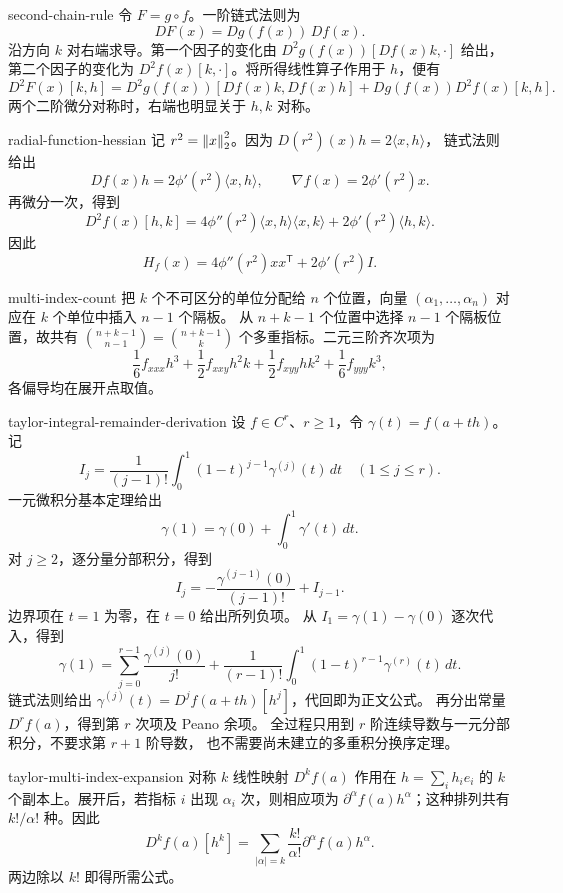 \begin{solution}{second-chain-rule}
令 $F=g\circ f$。一阶链式法则为
\[
 DF(x)=Dg(f(x))\,Df(x).
\]
沿方向 $k$ 对右端求导。第一个因子的变化由
$D^2g(f(x))[Df(x)k,\cdot]$ 给出，第二个因子的变化为
$D^2f(x)[k,\cdot]$。将所得线性算子作用于 $h$，便有
\[
 D^2F(x)[k,h]
 =D^2g(f(x))[Df(x)k,Df(x)h]
  +Dg(f(x))D^2f(x)[k,h].
\]
两个二阶微分对称时，右端也明显关于 $h,k$ 对称。
\end{solution}

\begin{solution}{radial-function-hessian}
记 $r^2=\left\lVert x\right\rVert_2^2$。因为 $D(r^2)(x)h=2\langle x,h\rangle$，
链式法则给出
\[
 Df(x)h=2\phi'(r^2)\langle x,h\rangle,
 \qquad
 \nabla f(x)=2\phi'(r^2)x.
\]
再微分一次，得到
\[
 D^2f(x)[h,k]
 =4\phi''(r^2)\langle x,h\rangle\langle x,k\rangle
  +2\phi'(r^2)\langle h,k\rangle.
\]
因此
\[
 H_f(x)=4\phi''(r^2)xx^{\mathsf T}+2\phi'(r^2)I.
\]
\end{solution}

\begin{solution}{multi-index-count}
把 $k$ 个不可区分的单位分配给 $n$ 个位置，向量
$(\alpha_1,\ldots,\alpha_n)$ 对应在 $k$ 个单位中插入 $n-1$ 个隔板。
从 $n+k-1$ 个位置中选择 $n-1$ 个隔板位置，故共有
\(
 \binom{n+k-1}{n-1}=\binom{n+k-1}{k}
\)
个多重指标。二元三阶齐次项为
\[
 \frac16f_{xxx}h^3+\frac12f_{xxy}h^2k
 +\frac12f_{xyy}hk^2+\frac16f_{yyy}k^3,
\]
各偏导均在展开点取值。
\end{solution}

\begin{solution}{taylor-integral-remainder-derivation}
设 \(f\in C^r\)、\(r\ge1\)，令 $\gamma(t)=f(a+th)$。
记
\[
 I_j=\frac1{(j-1)!}\int_0^1(1-t)^{j-1}\gamma^{(j)}(t)\,dt
 \quad(1\le j\le r).
\]
一元微积分基本定理给出
\[
 \gamma(1)=\gamma(0)+\int_0^1\gamma'(t)\,dt.
\]
对 \(j\ge2\)，逐分量分部积分，得到
\[
 I_j=-\frac{\gamma^{(j-1)}(0)}{(j-1)!}+I_{j-1}.
\]
边界项在 \(t=1\) 为零，在 \(t=0\) 给出所列负项。
从 \(I_1=\gamma(1)-\gamma(0)\) 逐次代入，得到
\[
 \gamma(1)=\sum_{j=0}^{r-1}\frac{\gamma^{(j)}(0)}{j!}
 +\frac1{(r-1)!}\int_0^1(1-t)^{r-1}\gamma^{(r)}(t)\,dt.
\]
链式法则给出
$\gamma^{(j)}(t)=D^jf(a+th)[h^j]$，代回即为正文公式。
再分出常量 \(D^rf(a)\)，得到第 \(r\) 次项及 Peano 余项。
全过程只用到 \(r\) 阶连续导数与一元分部积分，不要求第 \(r+1\) 阶导数，
也不需要尚未建立的多重积分换序定理。
\end{solution}

\begin{solution}{taylor-multi-index-expansion}
对称 $k$ 线性映射 $D^kf(a)$ 作用在
$h=\sum_i h_i e_i$ 的 $k$ 个副本上。展开后，若指标 $i$ 出现
$\alpha_i$ 次，则相应项为
$\partial^\alpha f(a)h^\alpha$；这种排列共有 $k!/\alpha!$ 种。因此
\[
 D^kf(a)[h^k]
 =\sum_{|\alpha|=k}\frac{k!}{\alpha!}
   \partial^\alpha f(a)h^\alpha.
\]
两边除以 $k!$ 即得所需公式。
\end{solution}

